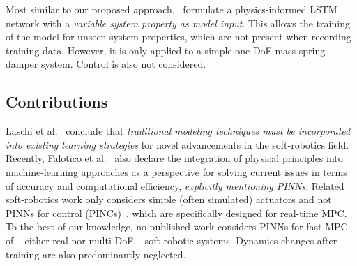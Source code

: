 Most similar to our proposed approach,~\cite{Wang.2024c} formulate a physics-informed LSTM network with a \textit{variable system property as model input}. 
This allows the training of the model for unseen system properties, which are not present when recording training data. 
However, it is only applied to a simple one-DoF mass-spring-damper system.
Control is also not considered.

\subsection{Contributions}
Laschi et al.~\cite{Laschi.2023} conclude that\textit{ traditional modeling techniques must be incorporated into existing learning strategies} for novel advancements in the soft-robotics field.
Recently, Falotico et al.~\cite{Falotico.2024} also declare the integration of physical principles into machine-learning approaches as a perspective for solving current issues in terms of accuracy and computational efficiency, \textit{explicitly mentioning PINNs}.  
Related soft-robotics work only considers simple (often simulated) actuators and not PINNs for control (PINCs)~\cite{Antonelo.2024}, which are specifically designed for real-time MPC.
To the best of our knowledge, no published work considers PINNs for fast MPC of -- either real nor multi-DoF -- soft robotic systems.
Dynamics changes after training are also predominantly neglected.

